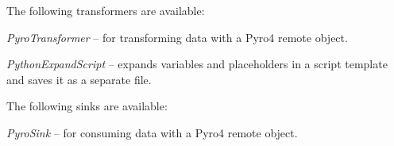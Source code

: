 \documentclass[a4paper]{book}
\begin{document}
The following transformers are available:
\begin{tight_itemize}
  \item \textit{PyroTransformer} -- for transforming data with a Pyro4\cite{pyro4} remote object.
  \item \textit{PythonExpandScript} -- expands variables and placeholders in a
  script template and saves it as a separate file.
\end{tight_itemize}

The following sinks are available:
\begin{tight_itemize}
  \item \textit{PyroSink} -- for consuming data with a Pyro4\cite{pyro4} remote object.
\end{tight_itemize}



\end{document}
